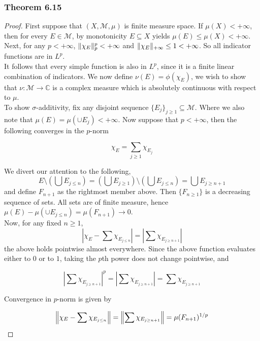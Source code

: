 \documentclass[../../main.tex]{subfiles}
\begin{document}
\subsubsection*{Theorem 6.15}
\begin{wts}
    
\end{wts}
\begin{proof}
First suppose that $(X,\mathcal{M}, \mu)$ is finite measure space. If $\mu(X)<+\infty$, then for every $E\in\mathcal{M}$, by monotonicity $E\subseteq X$ yields $\mu(E)\leq \mu(X)<+\infty$. Next, for any $p<+\infty$, $\lVert {\chi_E} \rVert ^p_p<+\infty$ and $\lVert {\chi_E} \rVert_{+\infty}\leq 1<+\infty$. So all indicator functions are in $L^p$.\\

It follows that every simple function is also in $L^p$, since it is a finite linear combination of indicators. We now define $\nu(E) = \phi(\chi_E)$, we wish to show that $\nu:\mathcal{M}\longrightarrow \mathbb{C}$ is a complex measure which is absolutely continuous with respect to $\mu$.\\

To show $\sigma$-additivity, fix any disjoint sequence $\{E_j\}_{j\geq 1}\subseteq \mathcal{M}$. Where we also note that $\mu(E) = \mu(\cup E_j) <+\infty$. Now suppose that $p<+\infty$, then the following converges in the $p$-norm

\[
\chi_E = \sum_{j\geq 1}\chi_{E_j}
\]

We divert our attention to the following,
\[
E\setminus\left(\bigcup E_{j\leq n}\right) = \left(\bigcup E_{j\geq 1}\right)\setminus \left(\bigcup E_{j\leq n}\right) = \bigcup E_{j\geq n+1}
\]
and define $F_{n+1}$ as the rightmost member above. Then $\{F_{n\geq 1}\}$ is a decreasing sequence of sets. All sets are of finite measure, hence $\mu(E) - \mu(\cup E_{j\leq n}) = \mu(F_{n+1})\to 0$.\\ 

Now, for any fixed $n\geq 1$, 
\[
\left|\chi_E - \sum \chi_{E_{j\leq n}}\right| = \left|\sum \chi_{E_{j\geq n+1}}\right| 
\]
the above holds pointwise almost everywhere. Since the above function evaluates either to $0$ or to $1$, taking the $p$th power does not change pointwise, and 

\[
\left|\sum \chi_{E_{j\geq n+1}}\right|^p = \left|\sum \chi_{E_{j\geq n+1}}\right| = \sum \chi_{E_{j\geq n+1}}
\]

Convergence in $p$-norm is given by

\[
\left\lVert {\chi_E - \sum \chi_{E_{j\leq n}}} \right\rVert = \left\lVert {\sum \chi_{E_{j\geq n+1}}} \right\rVert = \mu(F_{n+1})^{1/p}
\]


\end{proof}
\end{document}
